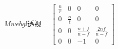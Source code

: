 $$
Mwebgl透视=
\begin{bmatrix}
  \frac{n}{r} & 0 & 0 & 0 \\
  0 & \frac{n}{t} & 0 & 0 \\
  0 & 0 & \frac{n + f}{n-f} & \frac{2nf}{n-f} \\
  0 & 0 & -1 & 0
\end{bmatrix}
$$